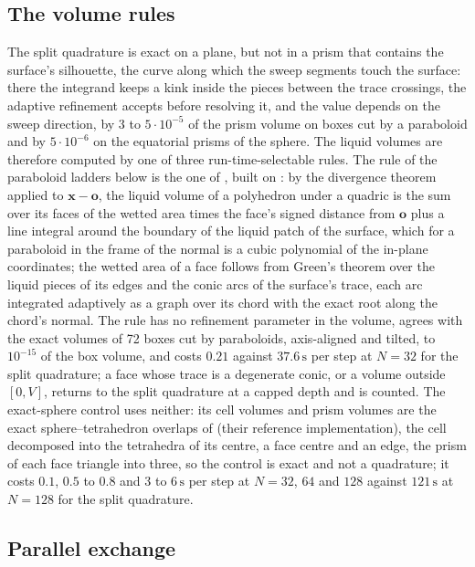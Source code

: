 \documentclass[preprint,12pt]{elsarticle}
\begin{document}
\subsection{The volume rules}
\label{app:tpf-rules}

The split quadrature is exact on a plane, but not in a prism that contains the surface's silhouette, the curve along which the sweep segments touch the surface: there the integrand keeps a kink inside the pieces between the trace crossings, the adaptive refinement accepts before resolving it, and the value depends on the sweep direction, by $3$ to $5\cdot10^{-5}$ of the prism volume on boxes cut by a paraboloid and by $5\cdot10^{-6}$ on the equatorial prisms of the sphere. The liquid volumes are therefore computed by one of three run-time-selectable rules. The rule of the paraboloid ladders below is the one of \citet{KromerBothe2023Init}, built on \citet{KromerBothe2019}: by the divergence theorem applied to $\mathbf{x} - \mathbf{o}$, the liquid volume of a polyhedron under a quadric is the sum over its faces of the wetted area times the face's signed distance from $\mathbf{o}$ plus a line integral around the boundary of the liquid patch of the surface, which for a paraboloid in the frame of the normal is a cubic polynomial of the in-plane coordinates; the wetted area of a face follows from Green's theorem over the liquid pieces of its edges and the conic arcs of the surface's trace, each arc integrated adaptively as a graph over its chord with the exact root along the chord's normal. The rule has no refinement parameter in the volume, agrees with the exact volumes of 72 boxes cut by paraboloids, axis-aligned and tilted, to $10^{-15}$ of the box volume, and costs $0.21$ against $37.6\,\mathrm{s}$ per step at $N = 32$ for the split quadrature; a face whose trace is a degenerate conic, or a volume outside $[0, V]$, returns to the split quadrature at a capped depth and is counted. The exact-sphere control uses neither: its cell volumes and prism volumes are the exact sphere--tetrahedron overlaps of \citet{StroblFormellaPoeschel2016} (their reference implementation), the cell decomposed into the tetrahedra of its centre, a face centre and an edge, the prism of each face triangle into three, so the control is exact and not a quadrature; it costs $0.1$, $0.5$ to $0.8$ and $3$ to $6\,\mathrm{s}$ per step at $N = 32$, $64$ and $128$ against $121\,\mathrm{s}$ at $N = 128$ for the split quadrature.

\subsection{Parallel exchange}
\label{app:tpf-parallel}
\end{document}
